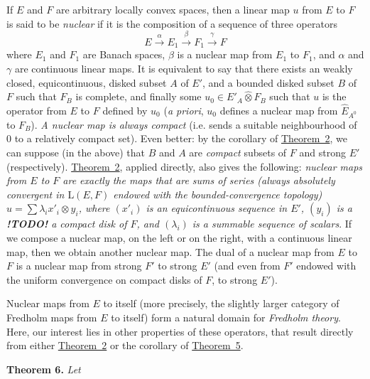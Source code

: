 \documentclass{article}
\theoremstyle{plain}
\newenvironment{itenv}[1]
  {\phantomsection\par\medskip\noindent\textbf{#1.}\itshape}
  {\medskip}
\newcommand{\LL}{\mathrm{L}}
\newcommand{\hotimes}{\widehat{\otimes}}
\newcommand{\todo}{\textbf{ !TODO! }}
\newcommand{\oldpage}[1]{\marginpar{\footnotesize$\Big\vert$ \textit{p.~#1}}}
\begin{document}
If $E$ and $F$ are arbitrary locally convex spaces, then a linear map $u$ from $E$ to $F$ is said to be \emph{nuclear} if it is the composition of a sequence of three operators
\[
  E \xrightarrow{\alpha} E_1 \xrightarrow{\beta} F_1 \xrightarrow{\gamma} F
\]
where $E_1$ and $F_1$ are Banach spaces, $\beta$ is a nuclear map from $E_1$ to $F_1$, and $\alpha$ and $\gamma$ are continuous linear maps.
It is
\oldpage{86}
equivalent to say that there exists an weakly closed, equicontinuous, disked subset $A$ of $E'$, and a bounded disked subset $B$ of $F$ such that $F_B$ is complete, and finally some $u_0\in E'_A\hotimes F_B$ such that $u$ is the operator from $E$ to $F$ defined by $u_0$ (\emph{a priori}, $u_0$ defines a nuclear map from $\widehat{E}_{A^0}$ to $F_B$).
\emph{A nuclear map is always compact} (i.e. sends a suitable neighbourhood of $0$ to a relatively compact set).
Even better: by the corollary of \hyperref[1.theorem2]{Theorem~2}, we can suppose (in the above) that $B$ and $A$ are \emph{compact} subsets of $F$ and strong $E'$ (respectively).
\hyperref[1.theorem2]{Theorem~2}, applied directly, also gives the following: \emph{nuclear maps from $E$ to $F$ are exactly the maps that are sums of series (always absolutely convergent in $\LL(E,F)$ endowed with the bounded-convergence topology) $u=\sum\lambda_i x'_i\otimes y_i$, where $(x'_i)$ is an equicontinuous sequence in $E'$, $(y_i)$ is a \todo a compact disk of $F$, and $(\lambda_i)$ is a summable sequence of scalars}.
If we compose a nuclear map, on the left or on the right, with a continuous linear map, then we obtain another nuclear map.
The dual of a nuclear map from $E$ to $F$ is a nuclear map from strong $F'$ to strong $E'$ (and even from $F'$ endowed with the uniform convergence on compact disks of $F$, to strong $E'$).

Nuclear maps from $E$ to itself (more precisely, the slightly larger category of Fredholm maps from $E$ to itself) form a natural domain for \emph{Fredholm theory}.
Here, our interest lies in other properties of these operators, that result directly from either \hyperref[1.theorem2]{Theorem~2} or the corollary of \hyperref[1.theorem5]{Theorem~5}.

\begin{itenv}{Theorem 6}
\label{1.theorem6}
  Let
\end{itenv}





\nocite{*}
\end{document}
